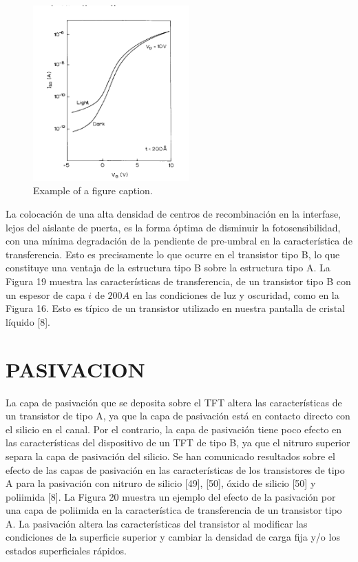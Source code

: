 \documentclass[conference]{IEEEtran}
\begin{document}
\begin{figure}[htbp]
    \centerline{\includegraphics[width=6.0cm]{img/imagen-19.png}}
    \caption{Example of a figure caption.}%
    \label{fig19}
\end{figure} 

    La colocación de una alta densidad de centros de recombinación en la interfase, lejos del 
    aislante de puerta, es la forma óptima de disminuir la fotosensibilidad, con una mínima 
    degradación de la pendiente de pre-umbral en la característica de transferencia. Esto es 
    precisamente lo que ocurre en el transistor tipo B, lo que constituye una ventaja de la 
    estructura tipo B sobre la estructura tipo A. La Figura 19 muestra las características de 
    transferencia, de un transistor tipo B con un espesor de capa $i$ de $200 A$ en las condiciones 
    de luz y oscuridad, como en la Figura 16. Esto es típico de un transistor utilizado en nuestra 
    pantalla de cristal líquido [8].

\section{PASIVACION}

    La capa de pasivación que se deposita sobre el TFT altera las características de un transistor 
    de tipo A, ya que la capa de pasivación está en contacto directo con el silicio en el canal. Por 
    el contrario, la capa de pasivación tiene poco efecto en las características del dispositivo de 
    un TFT de tipo B, ya que el nitruro superior separa la capa de pasivación del silicio. Se han 
    comunicado resultados sobre el efecto de las capas de pasivación en las características de los 
    transistores de tipo A para la pasivación con nitruro de silicio [49], [50], óxido de silicio [50] 
    y poliimida [8]. La Figura 20 muestra un ejemplo del efecto de la pasivación por una capa de 
    poliimida en la característica de transferencia de un transistor tipo A. La pasivación altera 
    las características del transistor al modificar las condiciones de la superficie superior y 
    cambiar la densidad de carga fija y/o los estados superficiales rápidos.
    
\end{document}
